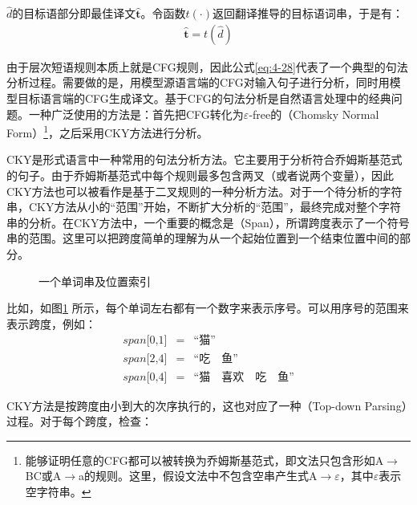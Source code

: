 \parinterval $\hat{d}$的目标语部分即最佳译文$\hat{\mathbf{t}}$。令函数$t(\cdot)$返回翻译推导的目标语词串，于是有：
\begin{eqnarray}
\hat{\mathbf{t}}=t(\hat{d})
\label{eq:4-29}
\end{eqnarray}

\parinterval 由于层次短语规则本质上就是CFG规则，因此公式\ref{eq:4-28}代表了一个典型的句法分析过程。需要做的是，用模型源语言端的CFG对输入句子进行分析，同时用模型目标语言端的CFG生成译文。基于CFG的句法分析是自然语言处理中的经典问题。一种广泛使用的方法是：首先把CFG转化为$\varepsilon$-free的{\small{}}（Chomsky Normal Form）\footnote[5]{能够证明任意的CFG都可以被转换为乔姆斯基范式，即文法只包含形如A$\to$BC或A$\to$a的规则。这里，假设文法中不包含空串产生式A$\to\varepsilon$，其中$\varepsilon$表示空字符串。}，之后采用CKY方法进行分析。

\parinterval CKY是形式语言中一种常用的句法分析方法\cite{cocke1969programming,younger1967recognition,kasami1966efficient}。它主要用于分析符合乔姆斯基范式的句子。由于乔姆斯基范式中每个规则最多包含两叉（或者说两个变量），因此CKY方法也可以被看作是基于二叉规则的一种分析方法。对于一个待分析的字符串，CKY方法从小的``范围''开始，不断扩大分析的``范围''，最终完成对整个字符串的分析。在CKY方法中，一个重要的概念是{\small{}}（Span），所谓跨度表示了一个符号串的范围。这里可以把跨度简单的理解为从一个起始位置到一个结束位置中间的部分。

\begin{figure}[htp]
\centering

\caption{一个单词串及位置索引}
\label{fig:4-35}
\end{figure}

比如，如图\ref{fig:4-35} 所示，每个单词左右都有一个数字来表示序号。可以用序号的范围来表示跨度，例如：
\begin{eqnarray}
span\textrm{[0,1]}&=&\textrm{``猫''} \nonumber \\
span\textrm{[2,4]}&=&\textrm{``吃} \quad \textrm{鱼''} \nonumber \\
span\textrm{[0,4]}&=&\textrm{``猫} \quad \textrm{喜欢} \quad \textrm{吃} \quad \textrm{鱼''} \nonumber
\end{eqnarray}

\parinterval CKY方法是按跨度由小到大的次序执行的，这也对应了一种{\small{}}（Top-down Parsing）过程。对于每个跨度，检查：

